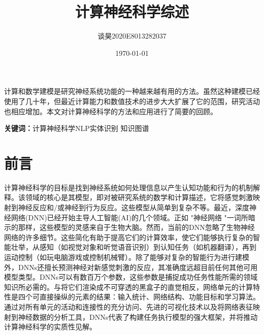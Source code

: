 \documentclass[UTF8,a4paper]{ctexart}
\title{\bfseries 计算神经科学综述}
\author{谈昊\quad2020E8013282037}
\date{\today}
\begin{document}
\maketitle


\begin{center}
\parbox{130mm}{
计算和数学建模是研究神经系统功能的一种越来越有用的方法。虽然这种建模已经使用了几十年，但最近计算能力和数值技术的进步大大扩展了它的范围，研究活动也相应增加。本文对计算神经科学的方法和应用进行了简要的回顾。
\par
\vspace{1mm}
{\bfseries 关键词：}计算神经科学\quad NLP\quad 实体识别 \quad 知识图谱}
\end{center}



\section{前言}
计算神经科学的目标是找到神经系统如何处理信息以产生认知功能和行为的机制解释。该领域的核心是其模型，即对被研究系统的数学和计算描述，它将感觉刺激映射到神经反应和/或神经到行为反应。这些模型从简单到复杂不等。最近，深度神经网络(DNN)已经开始主导人工智能(AI)的几个领域。正如 "神经网络 "一词所暗示的那样，这些模型的灵感来自于生物大脑。然而，当前的DNN忽略了生物神经网络的许多细节。这些简化有助于提高它们的计算效率，使它们能够执行复杂的智能壮举，从感知（如视觉对象和听觉语音识别）到认知任务（如机器翻译），再到运动控制（如玩电脑游戏或控制机械臂）。除了能够对复杂的智能行为进行建模外，DNNs还擅长预测神经对新感觉刺激的反应，其准确度远超目前任何其他可用模型类型。DNNs可以有数百万个参数，这些参数是捕捉成功任务性能所需的领域知识所必需的。与将它们渲染成不可穿透的黑盒子的直觉相反，网络单元的计算特性是四个可直接操纵的元素的结果：输入统计、网络结构、功能目标和学习算法。通过对所有单元的活动和连接性的充分访问、先进的可视化技术以及将网络表征映射到神经数据的分析工具，DNNs代表了构建任务执行模型的强大框架，并将推动计算神经科学的实质性见解。
\end{document}
